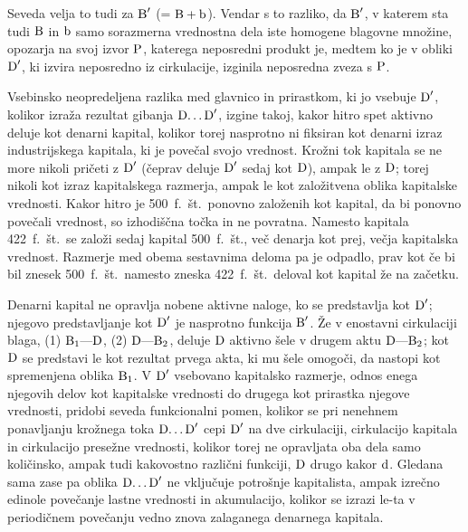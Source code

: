 \documentclass[kapital_02.tex]{subfiles}
\begin{document}
Seveda velja to tudi za \( \textrm{B}' \) (= \( \textrm{B} + \textrm{b} \)). Vendar s to razliko, da \( \textrm{B}' \), v katerem sta tudi \( \textrm{B} \) in \( \textrm{b} \) samo sorazmerna vrednostna dela iste homogene blagovne množine, opozarja na svoj izvor \( \textrm{P} \), katerega neposredni produkt je, medtem ko je v obliki \( \textrm{D}' \), ki izvira neposredno iz cirkulacije, izginila neposredna zveza s \( \textrm{P} \).

Vsebinsko neopredeljena razlika med glavnico in prirastkom, ki jo vsebuje \( \textrm{D}' \), kolikor izraža rezultat gibanja \( \textrm{D}\textrm{\dots}\textrm{D}' \), izgine takoj, kakor hitro spet aktivno deluje kot denarni kapital, kolikor torej nasprotno ni fiksiran kot denarni izraz industrijskega kapitala, ki je povečal svojo vrednost. Krožni tok kapitala se ne more nikoli pričeti z \( \textrm{D}' \) (čeprav deluje \( \textrm{D}' \) sedaj kot \( \textrm{D} \)), ampak le z \( \textrm{D} \); torej nikoli kot izraz kapitalskega razmerja, ampak le kot založitvena oblika kapitalske vrednosti. Kakor hitro je 500~f.~št.\ ponovno založenih kot kapital, da bi ponovno povečali vrednost, so izhodiščna točka in ne povratna. Namesto kapitala 422~f.~št.\ se založi sedaj kapital 500~f.~št., več denarja kot prej, večja kapitalska vrednost. Razmerje med obema sestavnima deloma pa je odpadlo, prav kot če bi bil znesek 500~f.~št.\ namesto zneska 422~f.~št.\ deloval kot kapital že na začetku.

Denarni kapital ne opravlja nobene aktivne naloge, ko se predstavlja kot \( \textrm{D}' \); njegovo predstavljanje kot \( \textrm{D}' \) je nasprotno funkcija \( \textrm{B}' \). Že v enostavni cirkulaciji blaga, (1) \( \textrm{B}_1\textrm{---}\textrm{D} \), (2) \( \textrm{D}\textrm{---}\textrm{B}_2 \), deluje \( \textrm{D} \) aktivno šele v drugem aktu \( \textrm{D}\textrm{---}\textrm{B}_2 \); kot \( \textrm{D} \) se predstavi le kot rezultat prvega akta, ki mu šele omogoči, da nastopi kot spremenjena oblika \( \textrm{B}_1 \). V \( \textrm{D}' \) vsebovano kapitalsko razmerje, odnos enega njegovih delov kot kapitalske vrednosti do drugega kot prirastka njegove vrednosti, pridobi seveda funkcionalni pomen, kolikor se pri nenehnem ponavljanju krožnega toka \( \textrm{D}\textrm{\dots}\textrm{D}' \) cepi \( \textrm{D}' \) na dve cirkulaciji, cirkulacijo kapitala in cirkulacijo presežne vrednosti, kolikor torej ne opravljata oba dela samo količinsko, ampak tudi kakovostno različni funkciji, \( \textrm{D} \) drugo kakor \( \textrm{d} \). Gledana sama zase pa oblika \( \textrm{D}\textrm{\dots}\textrm{D}' \) ne vključuje potrošnje kapitalista, ampak izrečno edinole povečanje lastne vrednosti in akumulacijo, kolikor se izrazi le-ta v periodičnem povečanju vedno znova zalaganega denarnega kapitala.
\end{document}
